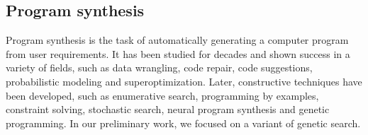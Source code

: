 \documentclass[11pt]{article}
\begin{document}
\subsection{Program synthesis}
Program synthesis is the task of automatically generating a computer program from user requirements.
It has been studied for decades and shown success in a variety of fields,
such as data wrangling\cite{inbook}, code repair\cite{d39antoni2016qlose}, code suggestions\cite{10.1145/2594291.2594321}, probabilistic modeling\cite{nori2015efficient} and superoptimization\cite{10.1145/36206.36194}.
Later, constructive techniques have been developed, such as enumerative
search\cite{6679385}, programming by examples\cite{inbook}, constraint solving\cite{CSP}, stochastic search\cite{schkufza2012stochastic}, neural program synthesis\cite{parisotto2016neurosymbolic} and genetic programming\cite{Koza92}.
In our preliminary work, we focused on a variant of genetic search.





\end{document}
